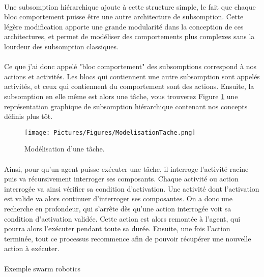 \documentclass[10pt,a4paper]{article}
\begin{document}
			\paragraph{}
			Une subsomption hiérarchique ajoute à cette structure simple, le fait que chaque bloc comportement puisse être une autre architecture de subsomption. Cette légère modification apporte une grande modularité dans la conception de ces architectures, et permet de modéliser des comportements plus complexes sans la lourdeur des subsomption classiques.
			
			\paragraph{}
			Ce que j'ai donc appelé "bloc comportement" des subsomptions correspond à nos actions et activités. Les blocs qui contiennent une autre subsomption sont appelés activités, et ceux qui contiennent du comportement sont des actions. Ensuite, la subsomption en elle même est alors une tâche, vous trouverez Figure \ref{ModelisationTache} une représentation graphique de subsomption hiérarchique contenant nos concepts définis plus tôt.
			
			\begin{figure}
			\centering
			\texttt{[image: Pictures/Figures/ModelisationTache.png]}
			\caption{Modélisation d'une tâche.}
			\label{ModelisationTache}
			\end{figure}
		\paragraph{}
			Ainsi, pour qu'un agent puisse exécuter une tâche, il interroge l'activité racine puis va récursivement interroger ses composants. Chaque activité ou action interrogée va ainsi vérifier sa condition d'activation. Une activité dont l'activation est valide va alors continuer d'interroger ses composantes. On a donc une recherche en profondeur, qui s'arrête dès qu'une action interrogée voit sa condition d'activation validée. Cette action est alors remontée à l'agent, qui pourra alors l'exécuter pendant toute sa durée. Ensuite, une fois l'action terminée, tout ce processus recommence afin de pouvoir récupérer une nouvelle action à exécuter.
			
			\paragraph{}
			Exemple swarm robotics
				
\end{document}
